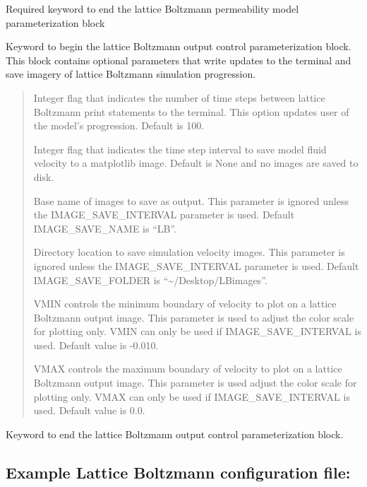 \documentclass[letterpaper,10pt,english]{sphinxmanual}
\begin{document}
 Required keyword to end the
lattice Boltzmann permeability model parameterization block

 Keyword to begin the lattice
Boltzmann output control parameterization block. This block contains
optional parameters that write updates to the terminal and save imagery
of lattice Boltzmann simulation progression.
\begin{quote}

 Integer flag that indicates the number of
time steps between lattice Boltzmann print statements to the
terminal. This option updates user of the model’s progression.
Default is 100.

 Integer flag that indicates
the time step interval to save model fluid velocity to a matplotlib
image. Default is None and no images are saved to disk.

 Base name of images to save as
output. This parameter is ignored unless the IMAGE\_SAVE\_INTERVAL
parameter is used. Default IMAGE\_SAVE\_NAME is “LB”.

 Directory location to save
simulation velocity images. This parameter is ignored unless the
IMAGE\_SAVE\_INTERVAL parameter is used. Default IMAGE\_SAVE\_FOLDER
is “\textasciitilde{}/Desktop/LBimages”.

 VMIN controls the minimum boundary of velocity
to plot on a lattice Boltzmann output image. This parameter is used
to adjust the color scale for plotting only. VMIN can only be used
if IMAGE\_SAVE\_INTERVAL is used. Default value is -0.010.

 VMAX controls the maximum boundary of velocity
to plot on a lattice Boltzmann output image. This parameter is used
adjust the color scale for plotting only. VMAX can only be used if
IMAGE\_SAVE\_INTERVAL is used. Default value is 0.0.
\end{quote}

 Keyword to end the lattice Boltzmann
output control parameterization block.


\subsection{Example Lattice Boltzmann configuration file:}
\label{\detokenize{index:example-lattice-boltzmann-configuration-file}}
\end{document}
